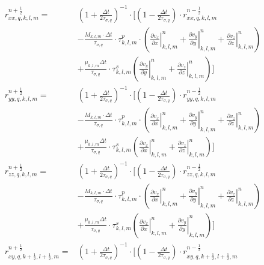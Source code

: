\documentclass[pdftex,a4paper,parskip,listof=totoc,bibliography=totoc,onehalfspacing,12pt]{scrreprt}
\begin{document}
\begin{align*}
	r_{xx,q,k,l,m}^{n+\frac{1}{2}} =& \left( 1+ \frac{\Delta t}{2\tau_{\sigma,q}} \right)^{-1}\cdot \Bigg[\left( 1- \frac{\Delta t}{2\tau_{\sigma,q}}  \right) \cdot r_{xx,q,k,l,m}^{n-\frac{1}{2}} \\ 
	& -\frac{M_{k,l,m}\cdot\Delta t}{\tau_{\sigma,q}}\cdot \tau^p_{k,l,m} \cdot \left( \left.\frac{\partial v_x}{\partial x}\right\rvert_{k,l,m}^{n} + \left.\frac{\partial v_y}{\partial y}\right\rvert_{k,l,m}^{n} + \left.\frac{\partial v_z}{\partial z}\right\rvert_{k,l,m}^{n} \right)\\
	& + \frac{\mu_{k,l,m} \Delta t}{\tau_{\sigma,q}}\cdot \tau_{k,l,m}^s \left( \left.\frac{\partial v_y}{\partial y}\right\rvert_{k,l,m}^{n} + \left.\frac{\partial v_z}{\partial z}\right\rvert_{k,l,m}^{n}  \right)\Bigg] \\
	r_{yy,q,k,l,m}^{n+\frac{1}{2}} =& \left( 1+ \frac{\Delta t}{2\tau_{\sigma,q}} \right)^{-1}\cdot \Bigg[\left( 1- \frac{\Delta t}{2\tau_{\sigma,q}}  \right) \cdot r_{yy,q,k,l,m}^{n-\frac{1}{2}} \\ 
	& -\frac{M_{k,l,m}\cdot\Delta t}{\tau_{\sigma,q}}\cdot \tau^p_{k,l,m} \cdot \left( \left.\frac{\partial v_x}{\partial x}\right\rvert_{k,l,m}^{n} + \left.\frac{\partial v_y}{\partial y}\right\rvert_{k,l,m}^{n} + \left.\frac{\partial v_z}{\partial z}\right\rvert_{k,l,m}^{n} \right)\\
	& + \frac{\mu_{k,l,m} \Delta t}{\tau_{\sigma,q}}\cdot \tau_{k,l,m}^s \left( \left.\frac{\partial v_x}{\partial x}\right\rvert_{k,l,m}^{n} + \left.\frac{\partial v_z}{\partial z}\right\rvert_{k,l,m}^{n}  \right)\Bigg] \\
	r_{zz,q,k,l,m}^{n+\frac{1}{2}} =& \left( 1+ \frac{\Delta t}{2\tau_{\sigma,q}} \right)^{-1}\cdot \Bigg[\left( 1- \frac{\Delta t}{2\tau_{\sigma,q}}  \right) \cdot r_{zz,q,k,l,m}^{n-\frac{1}{2}} \\ 
	& -\frac{M_{k,l,m}\cdot\Delta t}{\tau_{\sigma,q}}\cdot \tau^p_{k,l,m} \cdot \left( \left.\frac{\partial v_x}{\partial x}\right\rvert_{k,l,m}^{n} + \left.\frac{\partial v_y}{\partial y}\right\rvert_{k,l,m}^{n} + \left.\frac{\partial v_z}{\partial z}\right\rvert_{k,l,m}^{n} \right)\\
	& + \frac{\mu_{k,l,m} \Delta t}{\tau_{\sigma,q}}\cdot \tau_{k,l,m}^s \left( \left.\frac{\partial v_x}{\partial x}\right\rvert_{k,l,m}^{n} + \left.\frac{\partial v_y}{\partial y}\right\rvert_{k,l,m}^{n}  \right)\Bigg] \\
	r_{xy,q,k+\frac{1}{2},l+\frac{1}{2},m}^{n+\frac{1}{2}} =& \left( 1+ \frac{\Delta t}{2\tau_{\sigma,q}} \right)^{-1}\cdot \Bigg[\left( 1- \frac{\Delta t}{2\tau_{\sigma,q}}  \right) \cdot r_{xy,q,k+\frac{1}{2},l+\frac{1}{2},m}^{n-\frac{1}{2}} \\ 

\end{align*}
\end{document}
